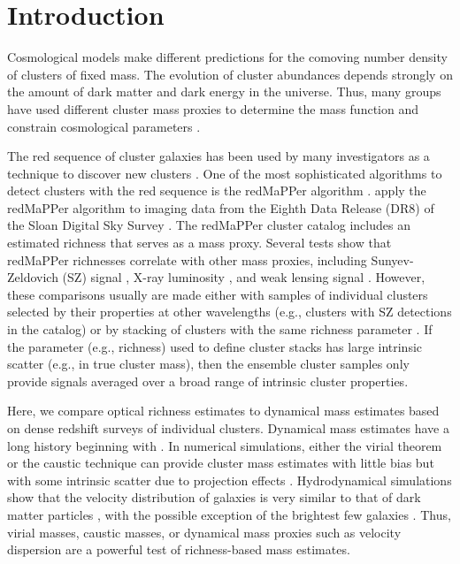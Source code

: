 \section{Introduction}

Cosmological models %
make different predictions for the comoving number density
of clusters of fixed mass.  The evolution of cluster abundances 
depends strongly on the amount of dark matter and dark energy in the 
universe. Thus, many groups have used different cluster mass proxies to 
determine the mass function and constrain cosmological parameters \citep[e.g.,][and references
therein]{cirsmf,rines08,vikhlinin09b,henry09,mantz10a,rozo10,benson13,hasselfield13,planckszcosmo,planckszcatalog,planckszcosmo2015,mantz15,dehaan16}.  

The red sequence of cluster galaxies has been used by many 
investigators as a technique to discover new clusters \citep{gladders00,gladders05,koester07a}.
One of the most sophisticated algorithms to detect clusters with the 
red sequence is the redMaPPer algorithm \citep{rykoff14}.
\citet{rykoff14} apply the redMaPPer algorithm to imaging data
from the Eighth Data Release (DR8) of the Sloan Digital Sky Survey \citep[SDSS;][]{dr8}.
The redMaPPer cluster catalog includes an estimated richness 
that %
serves as a mass proxy.  Several tests show that 
redMaPPer richnesses correlate with other mass proxies, including
Sunyev-Zeldovich (SZ) signal \citep{rozo14d}, X-ray luminosity \citep{sadibekova14,rozo14d}, 
and weak lensing signal \citep{simet17a}.  However, these comparisons
usually are made either with samples of individual clusters selected
by their properties at other wavelengths (e.g., clusters with SZ detections 
in the \Planck catalog) or by stacking of clusters with the same 
richness parameter \citep[e.g.,][]{rykoff08,andreon14,simet17a}.   If the parameter
(e.g., richness) used to define cluster stacks has large intrinsic
scatter (e.g., in true cluster mass), then the ensemble cluster samples 
only provide signals averaged over a broad range of intrinsic cluster properties. 


Here, we compare optical richness estimates to dynamical mass estimates 
based on dense redshift surveys of individual clusters.  Dynamical mass estimates 
have a long history beginning with \citet{zwicky1933,zwicky1937}.  
In numerical simulations, either the virial theorem or the caustic technique 
can provide cluster mass estimates with little bias but with some intrinsic 
scatter due to projection effects \citep{diaferio1999,evrard07,serra11,mamon13,gifford13,old14}.
Hydrodynamical simulations show that the velocity distribution of galaxies 
is very similar to that of dark matter particles \citep{faltenbacher06,lau10}, with the possible
exception of the brightest few galaxies \citep{lau10,wu13}.  Thus, virial masses, 
caustic masses, or dynamical mass proxies such as velocity dispersion 
are a powerful test of richness-based mass estimates.

